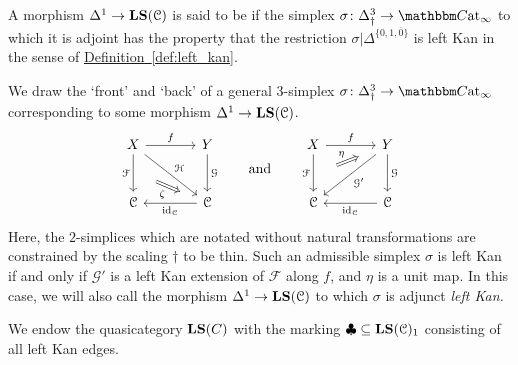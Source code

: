 \documentclass[main.tex]{subfiles}
\begin{document}
\begin{definition}
  \label{def:left_kan_simplex}
  A morphism $\Delta^{1} \to \mathbf{LS}(\mathcal{C})$ is said to be  if the simplex $\sigma\colon \Delta^{3}_{\dagger} \to \ICCat$ to which it is adjoint has the property that the restriction $\sigma|\Delta^{\{0,1,\overline{0}\}}$ is left Kan in the sense of \hyperref[def:left_kan]{Definition~\ref*{def:left_kan}}.
\end{definition}

We draw the `front' and `back' of a general $3$-simplex $\sigma\colon \Delta^{3}_{\dagger} \to \ICCat$ corresponding to some morphism $\Delta^{1} \to \mathbf{LS}(\mathcal{C})$.
\begin{equation*}
  \begin{tikzcd}[column sep=large, row sep=large]
    X
    \arrow[r, "f"]
    \arrow[d, "\mathcal{F}"{swap}, ""{name=L}]
    \arrow[dr, "\mathcal{H}"]
    & Y
    \arrow[d, "\mathcal{G}"]
    \\
    \category{C}
    & \category{C}
    \arrow[l, "\id_{\category{C}}"]
    \arrow[from=L, Rightarrow, shorten=3ex, "\zeta"{swap}]
  \end{tikzcd}
  \qquad\text{and}\qquad
  \begin{tikzcd}[column sep=large, row sep=large]
    X
    \arrow[r, "f"]
    \arrow[d, "\mathcal{F}"{swap}, ""{name=L}]
    & Y
    \arrow[d, "\mathcal{G}"]
    \arrow[dl, "\mathcal{G}'"]
    \arrow[from=L, Rightarrow, shorten=3ex, "\eta"]
    \\
    \category{C}
    & \category{C}
    \arrow[l, "\id_{\category{C}}"]
  \end{tikzcd}
\end{equation*}
Here, the $2$-simplices which are notated without natural transformations are constrained by the scaling $\dagger$ to be thin. Such an admissible simplex $\sigma$ is left Kan if and only if $\mathcal{G}'$ is a left Kan extension of $\mathcal{F}$ along $f$, and $\eta$ is a unit map. In this case, we will also call the morphism $\Delta^{1} \to \mathbf{LS}(\mathcal{C})$ to which $\sigma$ is adjunct \emph{left Kan.}

\begin{notation}
  We endow the quasicategory $\mathbf{LS}(C)$ with the marking $\clubsuit \subseteq \mathbf{LS}(\mathcal{C})_{1}$ consisting of all left Kan edges.
\end{notation}
\end{document}
